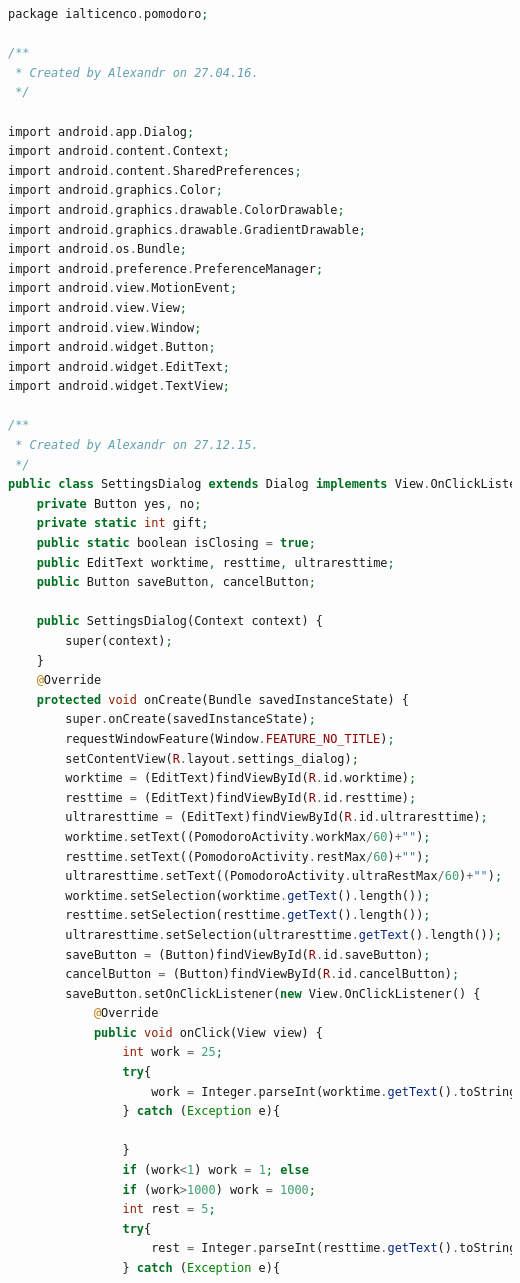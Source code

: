 \documentclass[12pt]{article}
\begin{document}
\begin{lstlisting}[language=php, caption={Fisierul SettingsDialog.php}, label=list2]
package ialticenco.pomodoro;

/**
 * Created by Alexandr on 27.04.16.
 */

import android.app.Dialog;
import android.content.Context;
import android.content.SharedPreferences;
import android.graphics.Color;
import android.graphics.drawable.ColorDrawable;
import android.graphics.drawable.GradientDrawable;
import android.os.Bundle;
import android.preference.PreferenceManager;
import android.view.MotionEvent;
import android.view.View;
import android.view.Window;
import android.widget.Button;
import android.widget.EditText;
import android.widget.TextView;

/**
 * Created by Alexandr on 27.12.15.
 */
public class SettingsDialog extends Dialog implements View.OnClickListener, View.OnTouchListener{
    private Button yes, no;
    private static int gift;
    public static boolean isClosing = true;
    public EditText worktime, resttime, ultraresttime;
    public Button saveButton, cancelButton;

    public SettingsDialog(Context context) {
        super(context);
    }
    @Override
    protected void onCreate(Bundle savedInstanceState) {
        super.onCreate(savedInstanceState);
        requestWindowFeature(Window.FEATURE_NO_TITLE);
        setContentView(R.layout.settings_dialog);
        worktime = (EditText)findViewById(R.id.worktime);
        resttime = (EditText)findViewById(R.id.resttime);
        ultraresttime = (EditText)findViewById(R.id.ultraresttime);
        worktime.setText((PomodoroActivity.workMax/60)+"");
        resttime.setText((PomodoroActivity.restMax/60)+"");
        ultraresttime.setText((PomodoroActivity.ultraRestMax/60)+"");
        worktime.setSelection(worktime.getText().length());
        resttime.setSelection(resttime.getText().length());
        ultraresttime.setSelection(ultraresttime.getText().length());
        saveButton = (Button)findViewById(R.id.saveButton);
        cancelButton = (Button)findViewById(R.id.cancelButton);
        saveButton.setOnClickListener(new View.OnClickListener() {
            @Override
            public void onClick(View view) {
                int work = 25;
                try{
                    work = Integer.parseInt(worktime.getText().toString());
                } catch (Exception e){

                }
                if (work<1) work = 1; else
                if (work>1000) work = 1000;
                int rest = 5;
                try{
                    rest = Integer.parseInt(resttime.getText().toString());
                } catch (Exception e){


\end{lstlisting}
\end{document}
